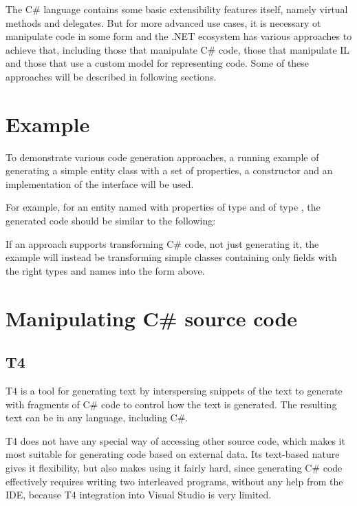 \medskip

The C\# language contains some basic extensibility features itself, namely virtual methods and delegates.
But for more advanced use cases, it is necessary ot manipulate code in some form and the .NET ecosystem has various approaches to achieve that, including those that manipulate C\# code, those that manipulate \ac{IL} and those that use a custom model for representing code. Some of these approaches will be described in following sections.

\section{Example}

To demonstrate various code generation approaches, a running example of generating a simple entity class with a set of properties, a constructor and an implementation of the  interface will be used.

For example, for an entity named  with properties  of type  and  of type , the generated code should be similar to the following:


If an approach supports transforming C\# code, not just generating it, the example will instead be transforming simple classes containing only fields with the right types and names into the form above.

\section{Manipulating C\# source code}

\subsection{\acs{T4}}

\ac{T4} is a tool for generating text by interspersing snippets of the text to generate with fragments of C\# code to control how the text is generated. The resulting text can be in any language, including C\#.

\ac{T4} does not have any special way of accessing other source code, which makes it most suitable for generating code based on external data. Its text-based nature gives it flexibility, but also makes using it fairly hard, since generating C\# code effectively requires writing two interleaved programs, without any help from the \ac{IDE}, because \ac{T4} integration into Visual Studio is very limited.

